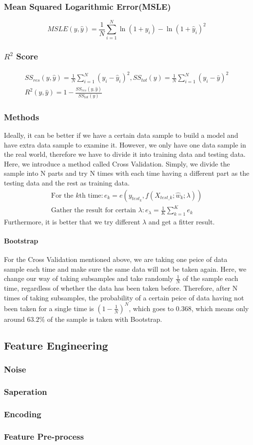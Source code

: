 \documentclass{article}
\begin{document}
	\subsubsection{Mean Squared Logarithmic Error(MSLE)}
	\begin{displaymath}
		MSLE(y,\hat{y}) = \frac{1}{N} \sum_{i=1}^{N}{\ln(1+y_i) - \ln(1+\hat{y}_i)^2}
	\end{displaymath}
	\subsubsection{$R^2$ Score}
	\begin{gather*}
		SS_{res}(y,\hat{y}) = \frac{1}{N} \sum_{i=1}^{N}(y_i-\hat{y}_i)^2,SS_{tot}(y) = \frac{1}{N}\sum_{i=1}^{N}(y_i - \bar{y})^2\\
		R^2(y,\hat{y}) = 1 - \frac{SS_{res}(y,\hat{y})}{SS_{tot}(y)}
	\end{gather*}
	\subsubsection{Methods}
	Ideally, it can be better if we have a certain data sample to build a model and have extra data sample to examine it. However, we only have one data sample in the real world, therefore we have to divide it into training data and testing data. Here, we introduce a method called Cross Validation. Simply, we divide the sample into N parts and try N times with each time having a different part as the testing data and the rest as training data.
	\begin{gather*}
		\mbox{For the $k$th time}:e_k = e(y_{test_k},f(X_{test\_k};\hat{w}_k;\lambda))\\
		\mbox{Gather the result for certain $\lambda$}:e_\lambda = \frac{1}{K} \sum_{k=1}^{K}e_k
	\end{gather*}
	Furthermore, it is better that we try different $\lambda$ and get a fitter result.
	\paragraph{Bootstrap}
	For the Cross Validation mentioned above, we are taking one peice of data sample each time and make sure the same data will not be taken again. Here, we change our way of taking subsamples and take randomly $\frac{1}{N}$ of the sample each time, regardless of whether the data has been taken before. Therefore, after N times of taking subsamples, the probability of a certain peice of data having not been taken for a single time is $(1-\frac{1}{N})^N$, which goes to 0.368, which means only around $63.2\%$ of the sample is taken with Bootstrap.
\subsection{Feature Engineering}
\subsubsection{Noise}
\subsubsection{Saperation}
\subsubsection{Encoding}
\subsubsection{Feature Pre-process}
\end{document}
